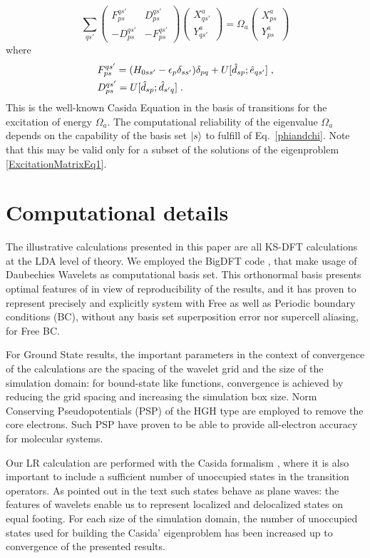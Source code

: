 \documentclass[reprint,aps,prb]{revtex4-1}
\newcommand{\eps}{\epsilon}
\newcommand{\be}{\begin{equation}}
\newcommand{\ee}{\end{equation}}
\newcommand{\nn}{\notag}
\newcommand{\lb}{\label}
\newcommand{\mat}[1]{\begin{pmatrix} #1\end{pmatrix}}
\newcommand{\op}[1]{\hat {#1}}
\newcommand{\excite}[2]{\op e_{{#1}{#2}}}
\newcommand{\decay}[2]{\op d_{{#1}{#2}}}
\begin{document}
\be\lb{ExcitationMatrixEq1}
\sum_{qs'}\mat{F_{ps}^{qs'} &  D_{ps}^{qs'}  \\
- D_{ps}^{qs'} & - F_{ps}^{qs'} }
\mat{X^a_{qs'} \\ Y^a_{qs'}} = \Omega_a \mat{X^a_{ps} \\ Y^a_{ps}}
\ee
where
\begin{align}
& F_{ps}^{qs'} = (H_{0 ss'}-\eps_p\delta_{ss'})\delta_{pq} + U[\decay{s}{p};\excite{q}{s'}] \;,\nn \\
& D_{ps}^{qs'} = U[\decay{s}{p};\decay{s'}{q}] \;.
\end{align}
This is the well-known Casida Equation in the basis of transitions for the excitation of energy $\Omega_a$. The computational reliability of the
eigenvalue $\Omega_a$ depends on the capability of the basis set $\ket{s}$ to fulfill of Eq.~\eqref{phiandchi}. Note that this may be valid only for a subset of the solutions of the eigenproblem \eqref{ExcitationMatrixEq1}.

\section{Computational details} \lb{compdetails}
The illustrative calculations presented in this paper are all KS-DFT calculations at the LDA level of theory. We employed the BigDFT code \cite{BigDFT},
that make usage of Daubechies Wavelets as computational basis set. This orthonormal basis presents optimal features of in view of reproducibility of the results, and it has proven to represent precisely and explicitly system with Free as well as Periodic boundary conditions (BC), without any basis set superposition error nor supercell aliasing, for Free BC.

For Ground State results, the important parameters in the context of convergence of the calculations are the spacing of the wavelet grid and the size of the simulation domain: for bound-state like functions, convergence is achieved by reducing the grid spacing and increasing the simulation box size.
Norm Conserving Pseudopotentials (PSP) of the HGH \cite{NLCCPSP} type are employed to remove the core electrons. Such PSP have proven to be able to provide all-electron accuracy for molecular systems.

Our LR calculation are performed with the Casida formalism \cite{bhaarathi}, where it is also important to include a sufficient number of unoccupied states in the transition operators. As pointed out in the text such states behave as plane waves: the features of wavelets enable us to represent localized and delocalized states on equal footing.
For each size of the simulation domain, the number of unoccupied states used for building the Casida' eigenproblem has been increased up to convergence of the presented results.
\end{document}
